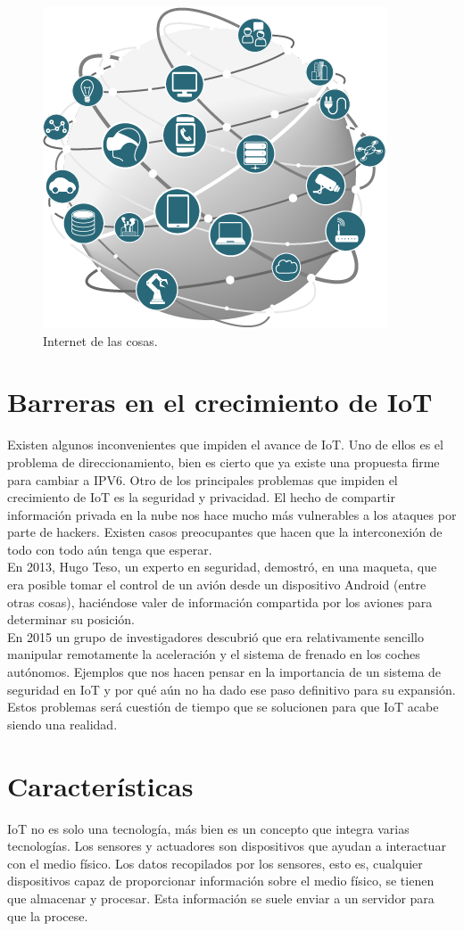 \documentclass[12pt, twoside]{book}
\begin{document}
\begin{figure}[H]
\centering
\includegraphics[scale=0.4]{images/iot}
\caption{Internet de las cosas.}\label{L105}
\end{figure}
\section{Barreras en el crecimiento de IoT}
Existen algunos inconvenientes que impiden el avance de IoT. Uno de ellos es el problema de direccionamiento, bien es cierto que ya existe una propuesta firme para cambiar a IPV6. Otro de los principales problemas que impiden el crecimiento de IoT es la seguridad y privacidad. El hecho de compartir información privada en la nube nos hace mucho más vulnerables a los ataques por parte de hackers. Existen casos preocupantes que hacen que la interconexión de todo con todo aún tenga que esperar. \\En 2013, Hugo Teso, un experto en seguridad, demostró, en una maqueta, que era posible tomar el control de un avión desde un dispositivo Android (entre otras cosas), haciéndose valer de información compartida por los aviones para determinar su posición. \\En 2015 un grupo de investigadores descubrió que era relativamente sencillo manipular remotamente la aceleración y el sistema de frenado en los coches autónomos. Ejemplos que nos hacen pensar en la importancia de un sistema de seguridad en IoT y por qué aún no ha dado ese paso definitivo para su expansión. Estos problemas será cuestión de tiempo que se solucionen para que IoT acabe siendo una realidad.
\section{Características}
IoT no es solo una tecnología, más bien es un concepto que integra varias tecnologías.
Los sensores y actuadores son dispositivos que ayudan a interactuar con el medio físico. Los datos recopilados por los sensores, esto es, cualquier dispositivos capaz de proporcionar información sobre el medio físico, se tienen que almacenar y procesar. Esta información se suele enviar a un servidor para que la procese.
\end{document}
